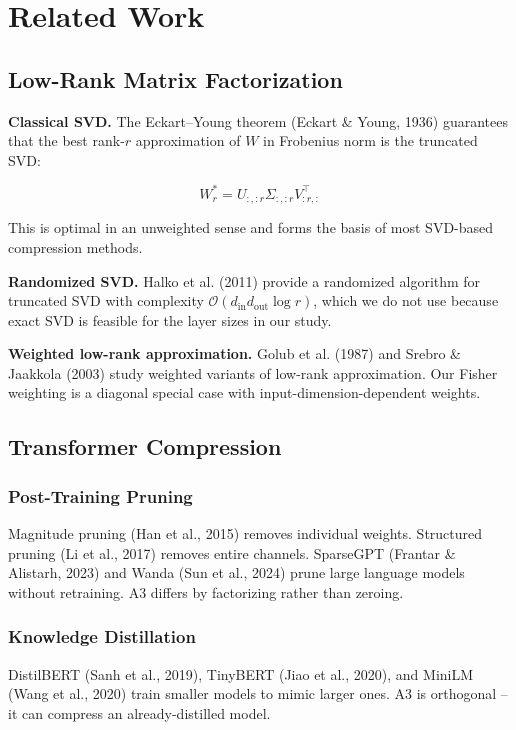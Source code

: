 
\section{Related Work}

\subsection{Low-Rank Matrix Factorization}

\textbf{Classical SVD.} The Eckart--Young theorem (Eckart \& Young, 1936) guarantees 
that the best rank-$r$ approximation of $W$ in Frobenius norm is the truncated 
SVD:

\[
W_r^* = U_{:, :r} \Sigma_{:, :r} V_{:r, :}^\top
\tag{2.1}
\]

This is optimal in an unweighted sense and forms the basis of most 
SVD-based compression methods.

\textbf{Randomized SVD.} Halko et al. (2011) provide a randomized algorithm for 
truncated SVD with complexity $\mathcal{O}(d_\text{in} d_\text{out} \log r)$, 
which we do not use because exact SVD is feasible for the layer sizes in our 
study.

\textbf{Weighted low-rank approximation.} Golub et al. (1987) and Srebro \& Jaakkola 
(2003) study weighted variants of low-rank approximation. Our Fisher weighting 
is a diagonal special case with input-dimension-dependent weights.

\subsection{Transformer Compression}

\subsubsection{Post-Training Pruning}

Magnitude pruning (Han et al., 2015) removes individual weights. Structured 
pruning (Li et al., 2017) removes entire channels. SparseGPT (Frantar \& 
Alistarh, 2023) and Wanda (Sun et al., 2024) prune large language models 
without retraining. A3 differs by factorizing rather than zeroing.

\subsubsection{Knowledge Distillation}

DistilBERT (Sanh et al., 2019), TinyBERT (Jiao et al., 2020), and MiniLM 
(Wang et al., 2020) train smaller models to mimic larger ones. A3 is 
orthogonal -- it can compress an already-distilled model.

